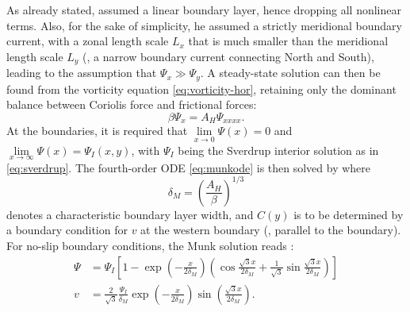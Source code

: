 As already stated, \citeauthor{munk} assumed a linear boundary layer, hence dropping all nonlinear terms. Also, for the sake of simplicity, he assumed a strictly meridional boundary current, with a zonal length scale \(L_x\) that is much smaller than the meridional length scale \(L_y\) (\ie, a narrow boundary current connecting North and South), leading to the assumption that \(\Psi_x \gg \Psi_y\). A steady-state solution can then be found from the vorticity equation \eqref{eq:vorticity-hor}, retaining only the dominant balance between Coriolis force and frictional forces:
%
\begin{equation}
\beta \Psi_x = A_H\Psi_{xxxx}. \label{eq:munkode}
\end{equation}
%
At the boundaries, it is required that \(\lim\limits_{x \to 0} \Psi(x) = 0\) and \(\lim\limits_{x \to \infty}\Psi(x) = \Psi_I (x,y)\), with \(\Psi_I\) being the Sverdrup interior solution as in \eqref{eq:sverdrup}. The fourth-order \ac{ODE} \eqref{eq:munkode} is then solved by
%
%
where
%
\begin{equation}
\delta_M = \left(\frac{A_H}{\beta}\right)^{1/3} \label{eq:munkwidth}
\end{equation}
%
denotes a characteristic boundary layer width, and \(C(y)\) is to be determined by a boundary condition for \(v\) at the western boundary (\ie, parallel to the boundary). For no-slip boundary conditions, the Munk solution reads \citep{pedloskyoct}:
%
\begin{align}
	\Psi &= \Psi_I \left[ 1 - \exp\left( -\frac{x}{2\delta_M} \right) \left( \cos \frac{\sqrt{3}x}{2\delta_M} + \frac{1}{\sqrt{3}} \sin \frac{\sqrt{3}x}{2\delta_M} \right) \right] \label{eq:munk-solution-noslip}\\
	v &= \frac{2}{\sqrt{3}} \frac{\Psi_I}{\delta_M} \exp\left( -\frac{x}{2\delta_M} \right) \sin \left( \frac{\sqrt{3}x}{2\delta_M} \right). \label{eq:munk-noslip}
\end{align}

\FloatBlock
